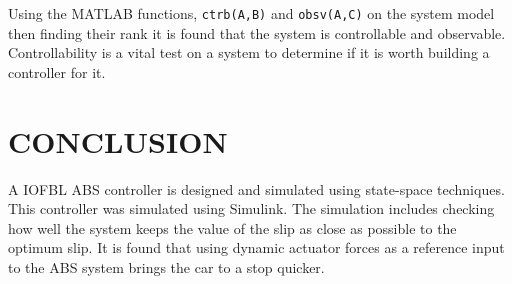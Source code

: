 \documentclass[10pt,twocolumn]{witseiepaper}
\begin{document}
Using the MATLAB functions, \verb|ctrb(A,B)| and \verb|obsv(A,C)| on the system model then finding their rank it is found that the system is controllable and observable. Controllability is a vital test on a system to determine if it is worth building a controller for it.

\section{CONCLUSION}

A IOFBL ABS controller is designed and simulated using state-space techniques. This controller was simulated using Simulink. The simulation includes checking how well the system keeps the value of the slip as close as possible to the optimum slip. It is found that using dynamic actuator forces as a reference input to the ABS system brings the car to a stop quicker.







\end{document}
